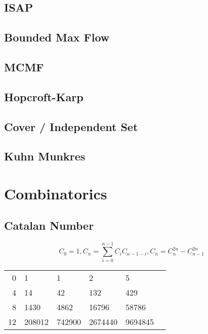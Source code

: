 \documentclass[a4paper,10pt,twocolumn,oneside]{article}
\begin{document}
\subsection{ISAP}


\subsection{Bounded Max Flow}


\subsection{MCMF}


\subsection{Hopcroft-Karp}


\subsection{Cover / Independent Set}


\subsection{Kuhn Munkres}


\section{Combinatorics}

\subsection{Catalan Number}
$$
C_0=1, C_n=\sum_{i=0}^{n-1} C_i C_{n-1-i}, C_n=C_n^{2n}-C_{n-1}^{2n}
$$

\begin{center}
    \begin{tabular}{r|lllll}
        0 & 1 & 1 & 2 & 5 \\
        4 & 14 & 42 & 132 & 429 \\
        8 & 1430 & 4862 & 16796 & 58786 \\
        12 & 208012 & 742900 & 2674440 & 9694845
    \end{tabular}
\end{center}
\end{document}
